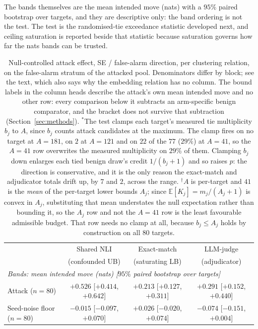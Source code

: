 The bands themselves are the mean intended move (nats) with a $95\%$ paired bootstrap over
targets, and they are descriptive only: the band ordering is not the test. The test is the
randomised-tie exceedance statistic developed next, and ceiling saturation is reported beside
that statistic because saturation governs how far the nats bands can be trusted.

\begin{table}[t]
\centering
\footnotesize
\setlength{\tabcolsep}{4pt}
\caption{Null-controlled attack effect, SE / false-alarm direction, per clustering relation,
on the false-alarm stratum of the attacked pool. Denominators differ by block; see the text,
which also says why the embedding relation has no column. The bound labels in the column
heads describe the attack's own mean intended move and no other row: every comparison below
it subtracts an arm-specific benign comparator, and the bracket does not survive that
subtraction (Section~\ref{sec:methods}).
$^{\ast}$The test clamps each target's measured tie multiplicity $b_j$ to $A$, since $b_j$
counts attack candidates at the maximum. The clamp fires on no target at $A{=}181$, on $2$
at $A{=}121$ and on $22$ of the $77$ ($29\%$) at $A{=}41$, so the $A{=}41$ row overwrites the
measured multiplicity on $29\%$ of them. Clamping $b_j$ down enlarges each tied benign
draw's credit $1/(b_j{+}1)$ and so raises $p$: the direction is conservative, and it is the
only reason the exact-match and adjudicator totals drift up, by $7$ and $2$, across the
range. $^{\dagger}$$A$ is per-target and $41$ is the \emph{mean} of the per-target lower
bounds $A_j$; since $\mathbb{E}[K_j]{=}m_j/(A_j{+}1)$ is convex in $A_j$, substituting that
mean understates the null expectation rather than bounding it, so the $A_j$ row and not the
$A{=}41$ row is the least favourable admissible budget. That row needs no clamp at all,
because $b_j{\leq}A_j$ holds by construction on all $80$ targets.}
\label{tab:nullcontrol}
\begin{tabular}{lccc}
\toprule
 & Shared NLI & Exact-match & LLM-judge \\
 & (confounded UB) & (saturating LB) & (adjudicator) \\
\midrule
\multicolumn{4}{l}{\emph{Bands: mean intended move (nats) [$95\%$ paired bootstrap over targets]}} \\
Attack ($n{=}80$)                        & $+0.526$ [$+0.414$, $+0.642$] & $+0.213$ [$+0.127$, $+0.311$] & $+0.291$ [$+0.152$, $+0.440$] \\
Seed-noise floor ($n{=}80$)              & $-0.015$ [$-0.097$, $+0.070$] & $+0.026$ [$-0.020$, $+0.074$] & $-0.074$ [$-0.151$, $+0.004$] \\

\end{tabular}
\end{table}
